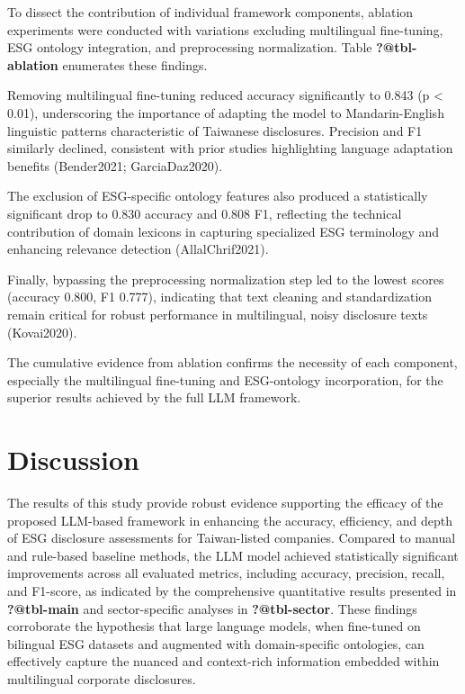 \documentclass[
  12pt,
]{article}
\begin{document}
To dissect the contribution of individual framework components, ablation
experiments were conducted with variations excluding multilingual
fine-tuning, ESG ontology integration, and preprocessing normalization.
Table \textbf{?@tbl-ablation} enumerates these findings.

Removing multilingual fine-tuning reduced accuracy significantly to
0.843 (p \textless{} 0.01), underscoring the importance of adapting the
model to Mandarin-English linguistic patterns characteristic of
Taiwanese disclosures. Precision and F1 similarly declined, consistent
with prior studies highlighting language adaptation benefits
(Bender2021; GarciaDaz2020).

The exclusion of ESG-specific ontology features also produced a
statistically significant drop to 0.830 accuracy and 0.808 F1,
reflecting the technical contribution of domain lexicons in capturing
specialized ESG terminology and enhancing relevance detection
(AllalChrif2021).

Finally, bypassing the preprocessing normalization step led to the
lowest scores (accuracy 0.800, F1 0.777), indicating that text cleaning
and standardization remain critical for robust performance in
multilingual, noisy disclosure texts (Kovai2020).

The cumulative evidence from ablation confirms the necessity of each
component, especially the multilingual fine-tuning and ESG-ontology
incorporation, for the superior results achieved by the full LLM
framework.

\section{Discussion}\label{discussion}

The results of this study provide robust evidence supporting the
efficacy of the proposed LLM-based framework in enhancing the accuracy,
efficiency, and depth of ESG disclosure assessments for Taiwan-listed
companies. Compared to manual and rule-based baseline methods, the LLM
model achieved statistically significant improvements across all
evaluated metrics, including accuracy, precision, recall, and F1-score,
as indicated by the comprehensive quantitative results presented in
\textbf{?@tbl-main} and sector-specific analyses in
\textbf{?@tbl-sector}. These findings corroborate the hypothesis that
large language models, when fine-tuned on bilingual ESG datasets and
augmented with domain-specific ontologies, can effectively capture the
nuanced and context-rich information embedded within multilingual
corporate disclosures.
\end{document}
